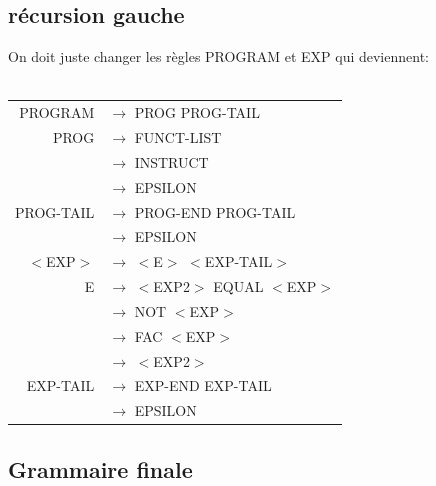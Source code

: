 \documentclass[a4paper,10pt]{article}
\begin{document}
\subsection{récursion gauche}

On doit juste changer les règles PROGRAM et EXP qui deviennent:\\
~\\


\begin{tabular}{rl}
PROGRAM				& $\rightarrow$ PROG PROG-TAIL \\
PROG				& $\rightarrow$ FUNCT-LIST\\
					& $\rightarrow$ INSTRUCT\\
					& $\rightarrow$ EPSILON\\
PROG-TAIL			& $\rightarrow$ PROG-END PROG-TAIL\\
					& $\rightarrow$ EPSILON\\

$<$EXP$>$			& $\rightarrow$ $<$E$>$ $<$EXP-TAIL$>$\\
E					& $\rightarrow$ $<$EXP2$>$ EQUAL $<$EXP$>$\\
					& $\rightarrow$ NOT $<$EXP$>$ \\
					& $\rightarrow$ FAC $<$EXP$>$ \\
					& $\rightarrow$ $<$EXP2$>$ \\

EXP-TAIL			& $\rightarrow$ EXP-END EXP-TAIL \\
					& $\rightarrow$ EPSILON \\
					
\end{tabular}

\pagebreak
\subsection{Grammaire finale}


~\\
\end{document}
